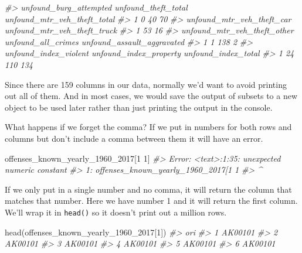 \documentclass[
  12pt,
]{book}
\newenvironment{Shaded}{\begin{snugshade}}{\end{snugshade}}
\newcommand{\CommentTok}[1]{\textcolor[rgb]{0.37,0.37,0.37}{\textit{#1}}}
\newcommand{\DecValTok}[1]{\textcolor[rgb]{0.06,0.06,0.06}{#1}}
\newcommand{\FunctionTok}[1]{\textcolor[rgb]{0,0,0}{#1}}
\newcommand{\NormalTok}[1]{#1}
\begin{document}
\begin{Shaded}
\begin{Highlighting}[]
\CommentTok{\#\textgreater{}   unfound\_burg\_attempted unfound\_theft\_total unfound\_mtr\_veh\_theft\_total}
\CommentTok{\#\textgreater{} 1                      0                  40                          70}
\CommentTok{\#\textgreater{}   unfound\_mtr\_veh\_theft\_car unfound\_mtr\_veh\_theft\_truck}
\CommentTok{\#\textgreater{} 1                        53                          16}
\CommentTok{\#\textgreater{}   unfound\_mtr\_veh\_theft\_other unfound\_all\_crimes unfound\_assault\_aggravated}
\CommentTok{\#\textgreater{} 1                           1                138                          2}
\CommentTok{\#\textgreater{}   unfound\_index\_violent unfound\_index\_property unfound\_index\_total}
\CommentTok{\#\textgreater{} 1                    24                    110                 134}
\end{Highlighting}
\end{Shaded}

Since there are 159 columns in our data, normally we'd want to avoid printing out all of them. And in most cases, we would save the output of subsets to a new object to be used later rather than just printing the output in the console.

What happens if we forget the comma? If we put in numbers for both rows and columns but don't include a comma between them it will have an error.

\begin{Shaded}
\begin{Highlighting}[]
\NormalTok{offenses\_known\_yearly\_1960\_2017[}\DecValTok{1} \DecValTok{1}\NormalTok{]}
\CommentTok{\#\textgreater{} Error: \textless{}text\textgreater{}:1:35: unexpected numeric constant}
\CommentTok{\#\textgreater{} 1: offenses\_known\_yearly\_1960\_2017[1 1}
\CommentTok{\#\textgreater{}                                       \^{}}
\end{Highlighting}
\end{Shaded}

If we only put in a single number and no comma, it will return the column that matches that number. Here we have number 1 and it will return the first column. We'll wrap it in \texttt{head()} so it doesn't print out a million rows.

\begin{Shaded}
\begin{Highlighting}[]
\FunctionTok{head}\NormalTok{(offenses\_known\_yearly\_1960\_2017[}\DecValTok{1}\NormalTok{])}
\CommentTok{\#\textgreater{}       ori}
\CommentTok{\#\textgreater{} 1 AK00101}
\CommentTok{\#\textgreater{} 2 AK00101}
\CommentTok{\#\textgreater{} 3 AK00101}
\CommentTok{\#\textgreater{} 4 AK00101}
\CommentTok{\#\textgreater{} 5 AK00101}
\CommentTok{\#\textgreater{} 6 AK00101}
\end{Highlighting}
\end{Shaded}
\end{document}
